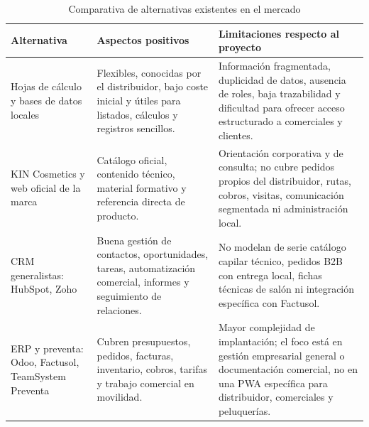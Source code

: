 {\small
\renewcommand{\arraystretch}{1.22}
\begin{table}[H]
\centering
\caption{Comparativa de alternativas existentes en el mercado}
\label{tab:comparativa-alternativas-mercado}
\begin{tabularx}{\textwidth}{>{\RaggedRight\arraybackslash}p{}>{\RaggedRight\arraybackslash}p{}>{\RaggedRight\arraybackslash}p{}}
\hline
\textbf{Alternativa} & \textbf{Aspectos positivos} & \textbf{Limitaciones respecto al proyecto} \\
\hline
Hojas de cálculo y bases de datos locales & Flexibles, conocidas por el distribuidor, bajo coste inicial y útiles para listados, cálculos y registros sencillos. & Información fragmentada, duplicidad de datos, ausencia de roles, baja trazabilidad y dificultad para ofrecer acceso estructurado a comerciales y clientes. \\
\hline
KIN Cosmetics y web oficial de la marca & Catálogo oficial, contenido técnico, material formativo y referencia directa de producto. & Orientación corporativa y de consulta; no cubre pedidos propios del distribuidor, rutas, cobros, visitas, comunicación segmentada ni administración local. \\
\hline
CRM generalistas: HubSpot, Zoho & Buena gestión de contactos, oportunidades, tareas, automatización comercial, informes y seguimiento de relaciones. & No modelan de serie catálogo capilar técnico, pedidos B2B con entrega local, fichas técnicas de salón ni integración específica con Factusol. \\
\hline
ERP y preventa: Odoo, Factusol, TeamSystem Preventa & Cubren presupuestos, pedidos, facturas, inventario, cobros, tarifas y trabajo comercial en movilidad. & Mayor complejidad de implantación; el foco está en gestión empresarial general o documentación comercial, no en una PWA específica para distribuidor, comerciales y peluquerías. \\
\hline
\end{tabularx}
\end{table}

}

